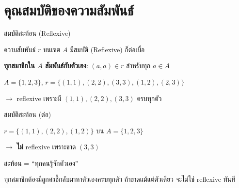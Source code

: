 \documentclass[11pt, aspectratio=169]{beamer}
\begin{document}
\section{คุณสมบัติของความสัมพันธ์}

\begin{frame}{สมบัติสะท้อน (Reflexive)}
  \begin{explanation}[นิยาม]
    ความสัมพันธ์ $r$ บนเซต $A$ มีสมบัติ  (Reflexive) ก็ต่อเมื่อ

    \medskip
    \textbf{ทุกสมาชิกใน $A$ สัมพันธ์กับตัวเอง}: $(a, a) \in r$ สำหรับทุก $a \in A$
  \end{explanation}

  \begin{exambox}[ตัวอย่าง]
    $A = \{1, 2, 3\}$,
    $r = \{(1,1), (2,2), (3,3), (1,2), (2,3)\}$
    \par $\rightarrow$ reflexive เพราะมี $(1,1), (2,2), (3,3)$ ครบทุกตัว
  \end{exambox}
\end{frame}

\begin{frame}{สมบัติสะท้อน (ต่อ)}
  \begin{exambox}
    $r = \{(1,1), (2,2), (1,2)\}$ บน $A = \{1, 2, 3\}$
    \par $\rightarrow$ \textbf{ไม่} reflexive เพราะขาด $(3,3)$
  \end{exambox}

  \begin{intuition}[คิดง่าย ๆ]
    สะท้อน = ``ทุกคนรู้จักตัวเอง''

    ทุกสมาชิกต้องมีลูกศรชี้กลับมาหาตัวเองครบทุกตัว
    ถ้าขาดแม้แต่ตัวเดียว จะไม่ใช่ reflexive ทันที
  \end{intuition}
\end{frame}
\end{document}

